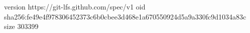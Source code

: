 version https://git-lfs.github.com/spec/v1
oid sha256:fe49e4f978306452373c6b0cbee3d468e1a670550924d5a9a330fc9d1034a83c
size 303399
